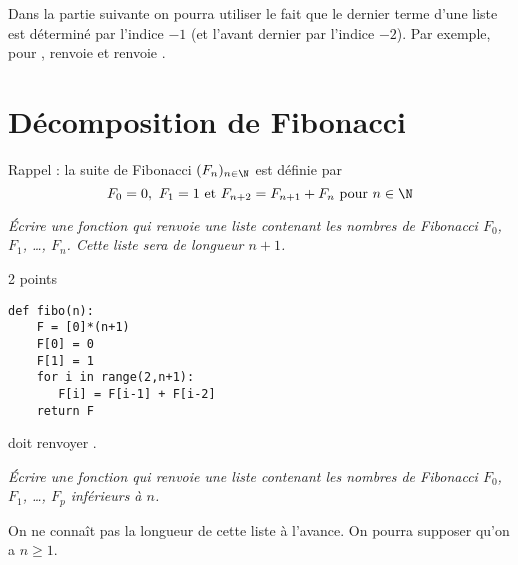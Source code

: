 Dans la partie suivante on pourra utiliser le fait que le dernier terme d'une liste est déterminé par l'indice $-1$ (et l'avant dernier par l'indice $-2$). Par exemple, pour ,  renvoie  et   renvoie .
\newpage
\section{Décomposition de Fibonacci}
Rappel : la suite de Fibonacci $(F_n)_{n\in \N}$ est définie par
\[F_0=0,\ F_1= 1\hbox{ et }F_{n+2} = F_{n+1} + F_n \hbox{ pour }n\in\N\]
\begin{Exercise}\it
Écrire une fonction  qui renvoie une liste contenant les nombres de Fibonacci $F_0$, $F_1$, \ldots, $F_n$. Cette liste sera de longueur $n+1$.
\end{Exercise}
\begin{Answer}2 points
\begin{lstlisting}
def fibo(n):
    F = [0]*(n+1)
    F[0] = 0
    F[1] = 1
    for i in range(2,n+1): 
       F[i] = F[i-1] + F[i-2]
    return F
\end{lstlisting}
\end{Answer}
 doit renvoyer \type{[0, 1, 1, 2, 3, 5, 8, 13, 21, 34, 55, 89, 144, 233, 377]}.
\begin{Exercise}\it
Écrire une fonction  qui renvoie une liste contenant les nombres de Fibonacci $F_0$, $F_1$, \ldots, $F_p$ inférieurs à $n$. 

On ne  connaît pas la longueur de cette liste à l'avance. On pourra supposer qu'on a $n\ge 1$.
\end{Exercise}
